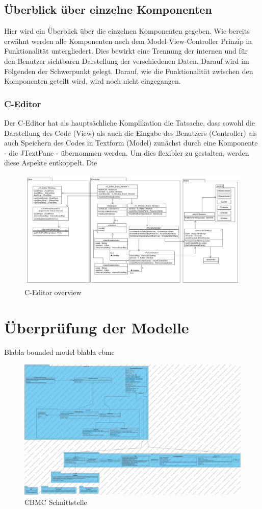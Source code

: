 \documentclass[a4paper]{scrreprt}
\begin{document}
\section{Überblick über einzelne Komponenten}
Hier wird ein Überblick über die einzelnen Komponenten gegeben. Wie bereits erwähnt werden alle Komponenten nach dem Model-View-Controller Prinzip in Funktionalität untergliedert. Dies bewirkt eine Trennung der internen und für den Benutzer sichtbaren Darstellung der verschiedenen Daten. Darauf wird im Folgenden der Schwerpunkt gelegt. Darauf, wie die Funktionalität zwischen den Komponenten geteilt wird, wird noch nicht eingegangen.

\subsection{C-Editor}
Der C-Editor hat als hauptsächliche Komplikation die Tatsache, dass sowohl die Darstellung des Code (View) als auch die Eingabe des Benutzers (Controller) als auch Speichern des Codes in Textform (Model) zunächst durch eine Komponente - die JTextPane - übernommen werden. Um dies flexibler zu gestalten, werden diese Aspekte entkoppelt. Die 

\begin{figure}[H]
\includegraphics[scale=0.4, angle = 270]{CEditorMVC.png}
\caption{C-Editor overview}
\label{C-Editor-MVC-overview}
\end{figure}

\chapter{Überprüfung der Modelle}
Blabla bounded model blabla cbmc

\begin{figure}[H]
\includegraphics[scale=0.25, angle = 270]{cbmcDiagram.jpg}
\caption{CBMC Schnittstelle}
\label{concrete_view_of_beast_architecture}
\end{figure}
\end{document}
